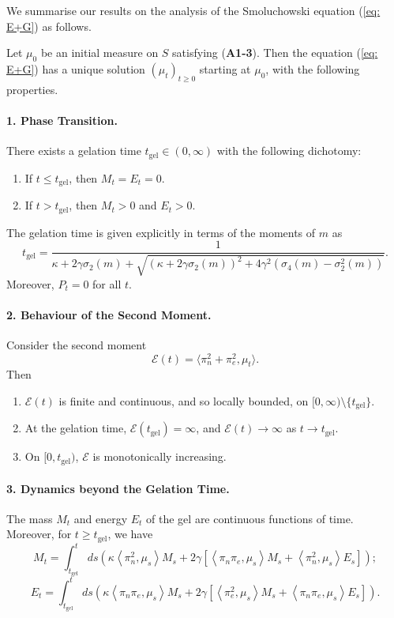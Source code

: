 We summarise our results on the analysis of the Smoluchowski equation (\ref{eq: E+G}) as follows.
\begin{theorem}
Let $\mu_0$ be an initial measure on $S$ satisfying (\textbf{A1-3}). Then the equation (\ref{eq: E+G}) has a unique solution $(\mu_t)_{t\geq 0}$ starting at $\mu_0$, with the following properties.
\paragraph{1. Phase Transition.} There exists a gelation time $t_\text{gel}\in(0,\infty)$ with the following dichotomy: \begin{enumerate}[label=\roman{*}).]
    \item If $t\leq t_\text{gel}$, then $M_t=E_t=0$.
    \item If $t>t_\text{gel}$, then $M_t>0$ and $E_t>0.$
\end{enumerate} The gelation time is given explicitly in terms of the moments of $m$ as \begin{equation}
       t_\text{gel}= \frac{1}{\kappa +2\gamma\sigma_2(m) + \sqrt{(\kappa+2\gamma\sigma_2(m))^2+4\gamma^2(\sigma_4(m)-\sigma_2^2(m))}}.
   \end{equation}
Moreover, $P_t=0$ for all $t.$
\paragraph{2. Behaviour of the Second Moment.} Consider the second moment \begin{equation} \mathcal{E}(t)=\langle \pi_n^2+ \pi_e^2, \mu_t\rangle. \end{equation} Then \begin{enumerate}[label=\roman{*}).]
    \item $\mathcal{E}(t)$ is finite and continuous, and so locally bounded, on $[0, \infty)\setminus\{t_\text{gel}\}.$ 
    \item At the gelation time, $\mathcal{E}(t_\text{gel})=\infty$, and $\mathcal{E}(t)\rightarrow \infty$ as $t\rightarrow t_\text{gel}.$ 
    \item On $[0, t_\text{gel})$, $\mathcal{E}$ is monotonically increasing. 
\end{enumerate}
\paragraph{3. Dynamics beyond the Gelation Time.} The mass $M_t$ and energy $E_t$ of the gel are continuous functions of time. Moreover, for $t\geq t_\text{gel}$, we have 
\begin{equation}
    M_t=\int_{t_\text{gel}}^t ds
    \left(
      \kappa \left<\pi_n^2,\mu_s\right>M_s +
      2\gamma \left[
        \left<\pi_n \pi_e,\mu_s \right>M_s +
        \left<\pi_n^2,\mu_s \right>E_s \right]
    \right);
\end{equation}
\begin{equation}
    E_t=\int_{t_\text{gel}}^t ds
    \left(
      \kappa \left<\pi_n \pi_e,\mu_s\right>M_s +
      2\gamma \left[
        \left<\pi_e^2,\mu_s \right>M_s +
        \left<\pi_n \pi_e,\mu_s \right>E_s \right]
    \right).
\end{equation}

\end{theorem}
